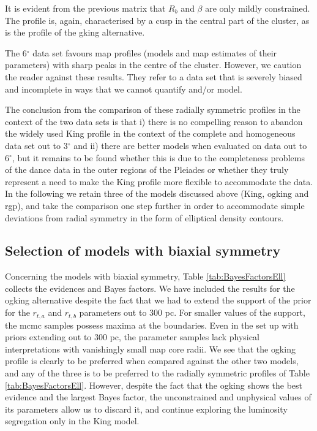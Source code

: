 It is evident from the previous matrix that $R_b$ and $\beta$ are only mildly constrained. The profile is, again, characterised by a cusp in the central part of the cluster, as is the profile of the \gls{gking} alternative. 

The 6$^{\circ}$ data set favours  \gls{map} profiles (models and \gls{map} estimates of their parameters) with sharp peaks in the centre of the cluster. However, we caution the reader against these results. They refer to a data set that is severely biased and incomplete in ways that we cannot quantify and/or model.

The conclusion from the comparison of these radially symmetric profiles in the context of the two data sets is that i) there is no compelling reason to abandon the widely used King profile in the context of the complete and homogeneous data set out to 3$^{\circ}$ and ii) there are better models when evaluated on data out to 6$^{\circ}$, but it remains to be found whether this is due to the completeness problems of the \gls{dance} data in the outer regions of the Pleiades or whether they truly represent a need to make the King profile more flexible to accommodate the data. In the following we retain three of the models discussed above (King, \gls{ogking} and \gls{rgp}), and take the comparison one step further in order to accommodate simple deviations from radial symmetry in the form of elliptical density contours.

\subsection{Selection of models with biaxial symmetry}

Concerning the models with biaxial symmetry, Table \ref{tab:BayesFactorsEll} collects the evidences and Bayes factors. We have included the results for the \gls{ogking} alternative despite the fact that we had to extend the support of the prior for the $r_{t,a}$ and $r_{t,b}$ parameters out to 300 pc. For smaller values of the support, the \gls{mcmc} samples possess maxima at the boundaries. Even in the set up with priors extending out to 300 pc, the parameter samples lack physical interpretations with vanishingly small \gls{map} core radii. We see that the \gls{ogking} profile is clearly to be preferred when compared against the other two models, and any of the three is to be preferred to the radially symmetric profiles of Table \ref{tab:BayesFactorsEll}. However, despite the fact that the \gls{ogking} shows the best evidence and the largest Bayes factor, the unconstrained and unphysical values of its parameters allow us to discard it, and continue exploring the luminosity segregation only in the King model.

